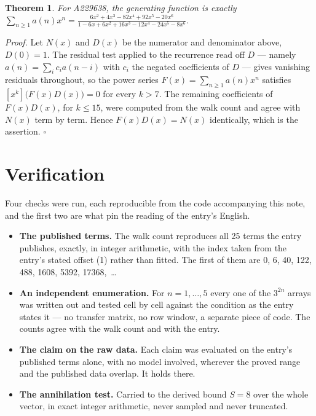 \documentclass[11pt]{article}
\newtheorem{theorem}{Theorem}
\theoremstyle{definition}
\begin{document}
\begin{theorem} For A229638, the generating function is exactly $\sum_{n\ge 1} a(n)x^n = \frac{6x^{2} + 4x^{3} - 82x^{4} + 92x^{5} - 20x^{6}}{1 - 6x + 6x^{2} + 16x^{3} - 12x^{4} - 24x^{5} - 8x^{6}}$.\end{theorem}

{\itshape Proof.} Let $N(x)$ and $D(x)$ be the numerator and denominator above, $D(0)=1$. The residual test applied to the recurrence read off $D$ --- namely $a(n) = \sum_i c_i a(n-i)$ with $c_i$ the negated coefficients of $D$ --- gives vanishing residuals throughout, so the power series $F(x)=\sum_{n\ge 1}a(n)x^n$ satisfies $[x^k]\bigl(F(x)D(x)\bigr) = 0$ for every $k > 7$. The remaining coefficients of $F(x)D(x)$, for $k \le 15$, were computed from the walk count and agree with $N(x)$ term by term. Hence $F(x)D(x) = N(x)$ identically, which is the assertion. $\square$

\section{Verification}

Four checks were run, each reproducible from the code accompanying this note, and the first two are what pin the reading of the entry's English.

\begin{itemize}

\item {\bfseries The published terms.} The walk count reproduces all 25 terms the entry publishes, exactly, in integer arithmetic, with the index taken from the entry's stated offset (1) rather than fitted. The first of them are 0, 6, 40, 122, 488, 1608, 5392, 17368,~\dots

\item {\bfseries An independent enumeration.} For $n = 1,\dots,5$ every one of the $3^{2n}$ arrays was written out and tested cell by cell against the condition as the entry states it --- no transfer matrix, no row window, a separate piece of code. The counts agree with the walk count and with the entry.

\item {\bfseries The claim on the raw data.} Each claim was evaluated on the entry's published terms alone, with no model involved, wherever the proved range and the published data overlap. It holds there.

\item {\bfseries The annihilation test.} Carried to the derived bound $S = 8$ over the whole vector, in exact integer arithmetic, never sampled and never truncated.

\end{itemize}
\end{document}
